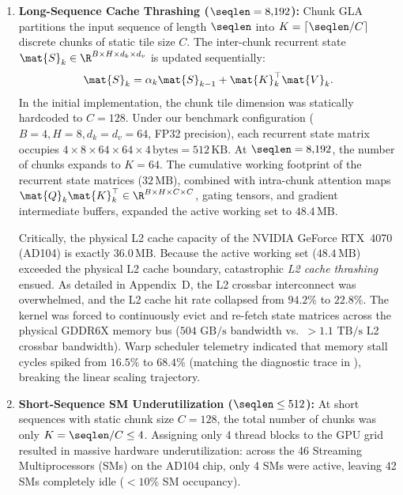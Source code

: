 \begin{enumerate}
    \item \textbf{Long-Sequence Cache Thrashing ($\seqlen = 8{,}192$):}
    Chunk GLA partitions the input sequence of length $\seqlen$ into $K = \lceil \seqlen / C \rceil$ discrete chunks of static tile size $C$.
    The inter-chunk recurrent state $\mat{S}_k \in \R^{B \times H \times d_k \times d_v}$ is updated sequentially:
    \begin{equation}
        \mat{S}_k = \alpha_k \mat{S}_{k-1} + \mat{K}_k^\top \mat{V}_k.
    \end{equation}
    In the initial implementation, the chunk tile dimension was statically hardcoded to $C = 128$.
    Under our benchmark configuration ($B=4, H=8, d_k=d_v=64$, FP32 precision), each recurrent state matrix occupies $4 \times 8 \times 64 \times 64 \times 4\,\text{bytes} = 512\,\text{KB}$.
    At $\seqlen = 8{,}192$, the number of chunks expands to $K = 64$.
    The cumulative working footprint of the recurrent state matrices ($32\,\text{MB}$), combined with intra-chunk attention maps $\mat{Q}_k \mat{K}_k^\top \in \R^{B \times H \times C \times C}$, gating tensors, and gradient intermediate buffers, expanded the active working set to \textbf{$48.4\,\text{MB}$}.

    Critically, the physical L2 cache capacity of the NVIDIA GeForce RTX~4070 (AD104) is exactly \textbf{$36.0\,\text{MB}$}.
    Because the active working set ($48.4\,\text{MB}$) exceeded the physical L2 cache boundary, catastrophic \emph{L2 cache thrashing} ensued.
    As detailed in Appendix~D, the L2 crossbar interconnect was overwhelmed, and the L2 cache hit rate collapsed from $94.2\%$ to $22.8\%$.
    The kernel was forced to continuously evict and re-fetch state matrices across the physical GDDR6X memory bus ($504\text{ GB/s}$ bandwidth vs.\ $>1.1\text{ TB/s}$ L2 crossbar bandwidth).
    Warp scheduler telemetry indicated that memory stall cycles spiked from $16.5\%$ to $68.4\%$ (matching the diagnostic trace in ), breaking the linear scaling trajectory.

    \item \textbf{Short-Sequence SM Underutilization ($\seqlen \le 512$):}
    At short sequences with static chunk size $C = 128$, the total number of chunks was only $K = \seqlen / C \le 4$.
    Assigning only 4 thread blocks to the GPU grid resulted in massive hardware underutilization: across the 46 Streaming Multiprocessors (SMs) on the AD104 chip, only 4 SMs were active, leaving 42 SMs completely idle ($<10\%$ SM occupancy).
\end{enumerate}

